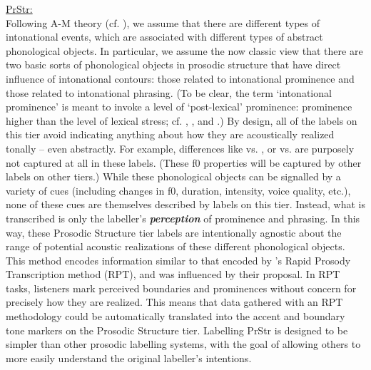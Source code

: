 \uline{PrStr:}\\ Following A-M theory (cf. \citealt{pierrehumbert80}), we assume that there are different types of intonational events, which are associated with different types of abstract phonological objects. In particular, we assume the now classic view that there are two basic sorts of phonological objects in prosodic structure that have direct influence of intonational contours: those related to intonational prominence and those related to intonational phrasing. (To be clear, the term ‘intonational prominence’ is meant to invoke a level of ‘post-lexical’ prominence: prominence higher than the level of lexical stress; cf. \citealt{bolinger58}, \citealt{libermanprince77}, and \citealt{beckmanedwards94}.) By design, all of the labels on this tier avoid indicating anything about how they are acoustically realized tonally – even abstractly. For example, differences like  vs. , or  vs.  are purposely not captured at all in these labels. (These f0 properties will be captured by other labels on other tiers.) While these phonological objects can be signalled by a variety of cues (including changes in f0, duration, intensity, voice quality, etc.), none of these cues are themselves described by labels on this tier. Instead, what is transcribed is only the labeller’s \textit{\textbf{perception}} of prominence and phrasing. In this way, these Prosodic Structure tier labels are intentionally agnostic about the range of potential acoustic realizations of these different phonological objects. This method encodes information similar to that encoded by \citeauthor{cole-14}’s \citeyear{cole-14} Rapid Prosody Transcription method (RPT), and was influenced by their proposal. In RPT tasks, listeners mark perceived boundaries and prominences without concern for precisely how they are realized. This means that data gathered with an RPT methodology could be automatically translated into the accent and boundary tone markers on the Prosodic Structure tier. Labelling PrStr is designed to be simpler than other prosodic labelling systems, with the goal of allowing others to more easily understand the original labeller’s intentions.

